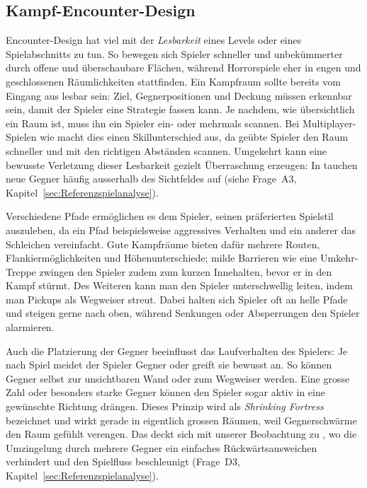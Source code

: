 \documentclass[../Main.tex]{subfiles}
\begin{document}
\subsection{Kampf-Encounter-Design} \label{sec:Encounter}
Encounter-Design hat viel mit der \textit{Lesbarkeit} eines Levels oder eines Spielabschnitts zu tun. So bewegen sich Spieler schneller und unbekümmerter durch offene und überschaubare Flächen, während Horrorspiele eher in engen und geschlossenen Räumlichkeiten stattfinden. Ein Kampfraum sollte bereits vom Eingang aus lesbar sein: Ziel, Gegnerpositionen und Deckung müssen erkennbar sein, damit der Spieler eine Strategie fassen kann.\autocite{gdc_horizonquests2018} Je nachdem, wie übersichtlich ein Raum ist, muss ihn ein Spieler ein- oder mehrmals scannen. Bei Multiplayer-Spielen wie  macht dies einen Skillunterschied aus, da geübte Spieler den Raum schneller und mit den richtigen Abständen scannen.\autocite{totten2014architectural} Umgekehrt kann eine bewusste Verletzung dieser Lesbarkeit gezielt Überraschung erzeugen: In  tauchen neue Gegner häufig ausserhalb des Sichtfeldes auf (siehe Frage~A3, Kapitel~\ref{sec:Referenzspielanalyse}).

Verschiedene Pfade ermöglichen es dem Spieler, seinen präferierten Spielstil auszuleben, da ein Pfad beispielsweise aggressives Verhalten und ein anderer das Schleichen vereinfacht.\autocite{gdc_tenprinciples2010} Gute Kampfräume bieten dafür mehrere Routen, Flankiermöglichkeiten und Höhenunterschiede; milde Barrieren wie eine Umkehr-Treppe zwingen den Spieler zudem zum kurzen Innehalten, bevor er in den Kampf stürmt.\autocite{gdc_horizonquests2018} Des Weiteren kann man den Spieler unterschwellig leiten, indem man Pickups als Wegweiser streut. Dabei halten sich Spieler oft an helle Pfade und steigen gerne nach oben, während Senkungen oder Absperrungen den Spieler alarmieren.\autocite{rogers2014levelup}

Auch die Platzierung der Gegner beeinflusst das Laufverhalten des Spielers: Je nach Spiel meidet der Spieler Gegner oder greift sie bewusst an. So können Gegner selbst zur unsichtbaren Wand oder zum Wegweiser werden.\autocite{totten2014architectural} Eine grosse Zahl oder besonders starke Gegner können den Spieler sogar aktiv in eine gewünschte Richtung drängen. Dieses Prinzip wird als \textit{Shrinking Fortress} bezeichnet und wirkt gerade in eigentlich grossen Räumen, weil Gegnerschwärme den Raum gefühlt verengen.\autocite{totten2014architectural} Das deckt sich mit unserer Beobachtung zu , wo die Umzingelung durch mehrere Gegner ein einfaches Rückwärtsausweichen verhindert und den Spielfluss beschleunigt (Frage~D3, Kapitel~\ref{sec:Referenzspielanalyse}).
\end{document}
